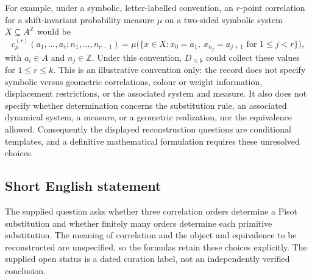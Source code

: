 \documentclass[11pt]{article}
\newcommand{\Z}{\mathbb{Z}}
\begin{document}
For example, under a symbolic, letter-labelled convention, an \(r\)-point correlation for a shift-invariant probability measure \(\mu\) on a two-sided symbolic system \(X\subseteq A^{\Z}\) would be
\[
c^{(r)}_\mu(a_1,\ldots,a_r;n_1,\ldots,n_{r-1})
=\mu\bigl(\{x\in X:x_0=a_1,\ x_{n_j}=a_{j+1}\text{ for }1\leq j<r\}\bigr),
\]
with \(a_i\in A\) and \(n_j\in\Z\). Under this convention, \(D_{\leq k}\) could collect these values for \(1\leq r\leq k\). This is an illustrative convention only: the record does not specify symbolic versus geometric correlations, colour or weight information, displacement restrictions, or the associated system and measure. It also does not specify whether determination concerns the substitution rule, an associated dynamical system, a measure, or a geometric realization, nor the equivalence allowed. Consequently the displayed reconstruction questions are conditional templates, and a definitive mathematical formulation requires these unresolved choices.
\subsection{Short English statement}
The supplied question asks whether three correlation orders determine a Pisot substitution and whether finitely many orders determine each primitive substitution. The meaning of correlation and the object and equivalence to be reconstructed are unspecified, so the formulas retain these choices explicitly. The supplied open status is a dated curation label, not an independently verified conclusion.
\end{document}
